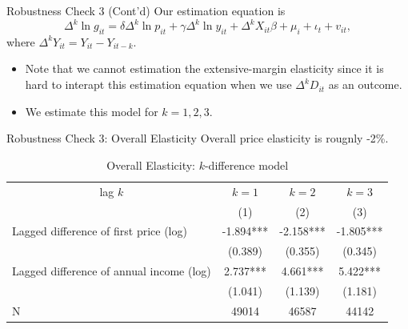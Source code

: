 \documentclass[
  ignorenonframetext,
]{beamer}
\providecommand{\tightlist}{%
  \setlength{\itemsep}{0pt}\setlength{\parskip}{0pt}}
\begin{document}
\begin{frame}{Robustness Check 3 (Cont'd)}
\protect\hypertarget{robustness-check-3-contd}{}
Our estimation equation is
\[\Delta^k \ln g_{it} = \delta \Delta^k \ln p_{it} + \gamma \Delta^k \ln y_{it} + \Delta^k X_{it} \beta + \mu_i + \iota_t + v_{it},\]
where \(\Delta^k Y_{it} = Y_{it} - Y_{it-k}\).

\begin{itemize}
\tightlist
\item
  Note that we cannot estimation the extensive-margin elasticity since it is hard to interapt this estimation equation when we use \(\Delta^k D_{it}\) as an outcome.
\item
  We estimate this model for \(k = 1, 2, 3\).
\end{itemize}
\end{frame}

\begin{frame}{Robustness Check 3: Overall Elasticity}
\protect\hypertarget{robustness-check-3-overall-elasticity}{}
Overall price elasticity is rougnly -2\%.

\begin{table}

\caption{\label{tab:kablekDiffElasticitySlide1}Overall Elasticity: $k$-difference model}
\centering
\fontsize{8}{10}\selectfont
\begin{tabular}[t]{lccc}
\toprule
\multicolumn{1}{c}{lag $k$} & \multicolumn{1}{c}{$k = 1$} & \multicolumn{1}{c}{$k = 2$} & \multicolumn{1}{c}{$k = 3$} \\
\cmidrule(l{3pt}r{3pt}){1-1} \cmidrule(l{3pt}r{3pt}){2-2} \cmidrule(l{3pt}r{3pt}){3-3} \cmidrule(l{3pt}r{3pt}){4-4}
 & (1) & (2) & (3)\\
\midrule
Lagged difference of first price (log) & -1.894*** & -2.158*** & -1.805***\\
 & (0.389) & (0.355) & (0.345)\\
Lagged difference of annual income (log) & 2.737*** & 4.661*** & 5.422***\\
 & (1.041) & (1.139) & (1.181)\\
N & 49014 & 46587 & 44142\\
\bottomrule
\end{tabular}
\end{table}
\end{frame}
\end{document}
